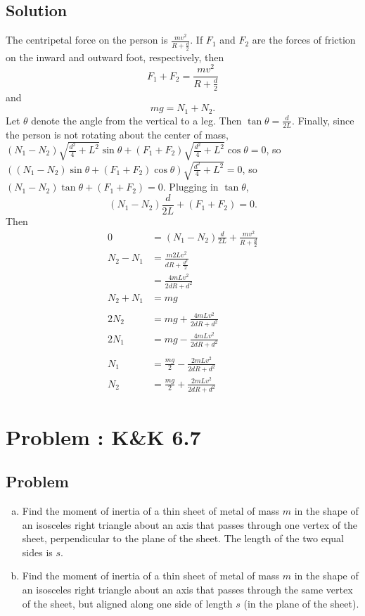 \documentclass[solutions]{esg8012pset}
\begin{document}
\subsection{Solution}
  The centripetal force on the person is $\frac{m v^2}{R + \frac{d}{2}}$.  If $F_1$ and $F_2$ are the forces of friction on the inward and outward foot, respectively, then $$F_1 + F_2 = \frac{m v^2}{R + \frac{d}{2}}$$ and $$m g = N_1 + N_2.$$  Let $\theta$ denote the angle from the vertical to a leg.  Then $\tan\theta = \frac{d}{2L}$.  Finally, since the person is not rotating about the center of mass, $(N_1 - N_2)\sqrt{\frac{d^2}{4} + L^2}\sin\theta + (F_1 + F_2)\sqrt{\frac{d^2}{4} + L^2}\cos\theta = 0$, so $((N_1 - N_2)\sin\theta + (F_1 + F_2)\cos\theta)\sqrt{\frac{d^2}{4} + L^2} = 0$, so $(N_1 - N_2)\tan\theta + (F_1 + F_2) = 0$.  Plugging in $\tan\theta$, $$(N_1 - N_2)\frac{d}{2L} + (F_1 + F_2) = 0.$$  Then \begin{align*}
  0 & = (N_1 - N_2)\frac{d}{2L} + \frac{m v^2}{R + \frac{d}{2}} \\
  N_2 - N_1 & = \frac{m 2L v^2}{d R + \frac{d^2}{2}} \\
    & = \frac{4 m L v^2}{2 d R + d^2} \\
  N_2 + N_1 & = m g \\
  \\
  2N_2 & = mg + \frac{4 m L v^2}{2 d R + d^2} \\
  2N_1 & = m g - \frac{4 m L v^2}{2 d R + d^2} \\
  \\
  N_1 & = \frac{m g}{2} - \frac{2 m L v^2}{2 d R + d^2} \\
  N_2 & = \frac{m g}{2} + \frac{2 m L v^2}{2 d R + d^2}
  \end{align*}
\section{Problem \thesection: K\&K 6.7}
\subsection{Problem}
  \begin{enumerate}[(a)]
    \item Find the moment of inertia of a thin sheet of metal of mass $m$ in the shape of an isosceles right triangle about an axis that passes through one vertex of the sheet, perpendicular to the plane of the sheet. The length of the two equal sides is $s$.
    \item Find the moment of inertia of a thin sheet of metal of mass $m$ in the shape of an isosceles right triangle about an axis that passes through the same vertex of the sheet, but aligned along one side of length $s$ (in the plane of the sheet).
  \end{enumerate}
\end{document}
